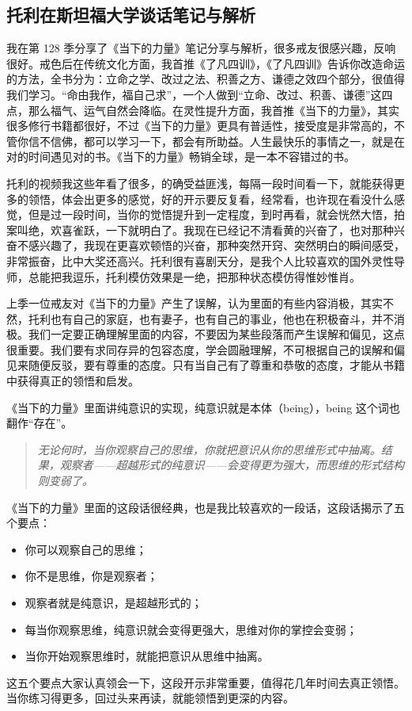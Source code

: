 \subsection{托利在斯坦福大学谈话笔记与解析}

我在第 128 季分享了《当下的力量》笔记分享与解析，很多戒友很感兴趣，反响很好。戒色后在传统文化方面，我首推《了凡四训》，《了凡四训》告诉你改造命运的方法，全书分为：立命之学、改过之法、积善之方、谦德之效四个部分，很值得我们学习。“命由我作，福自己求”，一个人做到“立命、改过、积善、谦德”这四点，那么福气、运气自然会降临。在灵性提升方面，我首推《当下的力量》，其实很多修行书籍都很好，不过《当下的力量》更具有普适性，接受度是非常高的，不管你信不信佛，都可以学习一下，都会有所助益。人生最快乐的事情之一，就是在对的时间遇见对的书。《当下的力量》畅销全球，是一本不容错过的书。

托利的视频我这些年看了很多，的确受益匪浅，每隔一段时间看一下，就能获得更多的领悟，体会出更多的感觉，好的开示要反复看，经常看，也许现在看没什么感觉，但是过一段时间，当你的觉悟提升到一定程度，到时再看，就会恍然大悟，拍案叫绝，欢喜雀跃，一下就明白了。我现在已经记不清看黄的兴奋了，也对那种兴奋不感兴趣了，我现在更喜欢顿悟的兴奋，那种突然开窍、突然明白的瞬间感受，非常振奋，比中大奖还高兴。托利很有喜剧天分，是我个人比较喜欢的国外灵性导师，总能把我逗乐，托利模仿效果是一绝，把那种状态模仿得惟妙惟肖。

上季一位戒友对《当下的力量》产生了误解，认为里面的有些内容消极，其实不然，托利也有自己的家庭，也有妻子，也有自己的事业，他也在积极奋斗，并不消极。我们一定要正确理解里面的内容，不要因为某些段落而产生误解和偏见，这点很重要。我们要有求同存异的包容态度，学会圆融理解，不可根据自己的误解和偏见来随便反驳，要有尊重的态度。只有当自己有了尊重和恭敬的态度，才能从书籍中获得真正的领悟和启发。

《当下的力量》里面讲纯意识的实现，纯意识就是本体（being），being 这个词也翻作“存在”。

\begin{quote}\it
    无论何时，当你观察自己的思维，你就把意识从你的思维形式中抽离。结果，观察者——超越形式的纯意识——会变得更为强大，而思维的形式结构则变弱了。
\end{quote}

《当下的力量》里面的这段话很经典，也是我比较喜欢的一段话，这段话揭示了五个要点：\begin{itemize}
    \item 你可以观察自己的思维；
    \item 你不是思维，你是观察者；
    \item 观察者就是纯意识，是超越形式的；
    \item 每当你观察思维，纯意识就会变得更强大，思维对你的掌控会变弱；
    \item 当你开始观察思维时，就能把意识从思维中抽离。
\end{itemize} 这五个要点大家认真领会一下，这段开示非常重要，值得花几年时间去真正领悟。当你练习得更多，回过头来再读，就能领悟到更深的内容。

